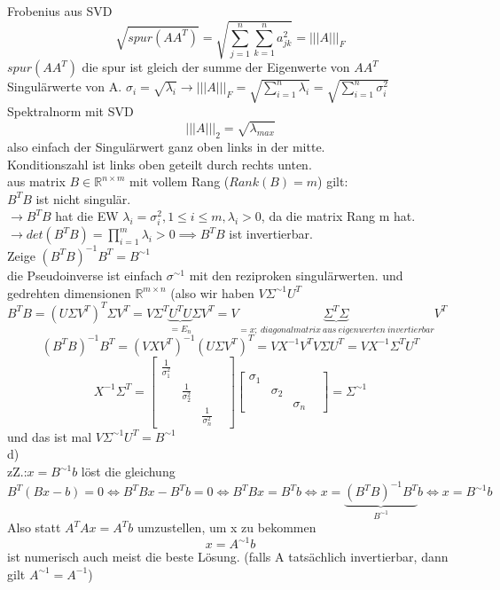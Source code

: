 \documentclass{article}
\begin{document}
	Frobenius aus SVD
	\[\sqrt{spur(AA^T)} = \sqrt{\sum^n_{j=1}\sum^n_{k=1} a_{jk}^2} =|||A|||_F\]
	$spur(AA^T)$ die spur ist gleich der summe der Eigenwerte von $AA^T$\\
	Singulärwerte von A. $\sigma_i =\sqrt{\lambda_i}\to |||A|||_F = \sqrt{\sum^n_{i=1} \lambda_i} = \sqrt{\sum^n_{i=1} \sigma^2_i}$\\
	Spektralnorm mit SVD\\
	\[|||A|||_2 =\sqrt{\lambda_{max}}\]
	also einfach der Singulärwert ganz oben links in der mitte.\\
	Konditionszahl ist links oben geteilt durch rechts unten.\\
	aus matrix $B\in\mathbb{R}^{n\times m}$ mit vollem Rang ($Rank(B)=m$) gilt:\\
	$B^TB$ ist nicht singulär.\\
	$\to B^TB$ hat die EW $\lambda_i=\sigma^2_i, 1\leq i\leq m, \lambda_i >0$, da die matrix Rang m hat.\\
	$\to det(B^TB) = \prod_{i=1}^m\lambda_i>0\implies B^TB$ ist invertierbar.\\
	Zeige $(B^TB)^{-1} B^T = B^{\sim 1}$\\
	die Pseudoinverse ist einfach $\sigma^{\sim1}$ mit den reziproken singulärwerten. und gedrehten dimensionen $\mathbb{R}^{m\times n}$ (also wir haben $V\Sigma^{\sim1}U^T$\\
	$B^TB = (U\Sigma V^T)^T \Sigma V^T = V\Sigma^T \underbrace{U^TU}_{=E_n}\Sigma V^T=V\underbrace{\Sigma^T\Sigma}_{=x;\ diagonalmatrix\ aus\ eigenwerten\ invertierbar} V^T$\\
	\[(B^TB)^{-1}B^T=(VXV^T)^{-1}(U\Sigma V^T)^T = VX^{-1} V^TV\Sigma U^T = VX^{-1}\Sigma^T U^T\]
	\[X^{-1}\Sigma^T = \begin{bmatrix}\frac{1}{\sigma_1^2}&&\\&\frac{1}{\sigma_2^2}&&\\ &&\frac{1}{\sigma_n^2} \end{bmatrix}\begin{bmatrix}\sigma_1&&\\&\sigma_2&&\\ &&\sigma_n \end{bmatrix} =\Sigma^{\sim 1}\]
	und das ist mal $V\Sigma^{\sim1}U^T = B^{\sim1}$\\
	d)\\
	zZ.:$x=B^{\sim1}b$ löst die gleichung
	\[B^T(Bx-b) = 0\iff B^TBx-B^Tb =0\iff B^TBx = B^Tb \iff x = \underbrace{(B^TB)^{-1}B^T}_{B^{\sim 1}}b \iff x=B^{\sim1}b\]
	Also statt $A^TAx=A^Tb$ umzustellen, um x zu bekommen
	\[x=A^{\sim1}b\]
	ist numerisch auch meist die beste Lösung. (falls A tatsächlich invertierbar, dann gilt $A^{\sim1} = A^{-1}$)
\end{document}
